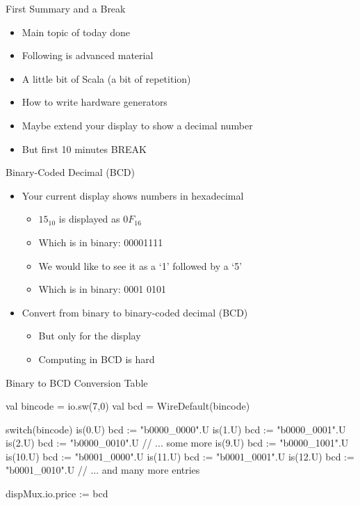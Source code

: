 \begin{frame}[fragile]{First Summary and a Break}
\begin{itemize}
\item Main topic of today done
\item Following is advanced material
\item A little bit of Scala (a bit of repetition)
\item How to write hardware generators
\item Maybe extend your display to show a decimal number
\item But first 10 minutes BREAK
\end{itemize}
\end{frame}


\begin{frame}[fragile]{Binary-Coded Decimal (BCD)}
\begin{itemize}
\item Your current display shows numbers in hexadecimal
\begin{itemize}
\item $15_{10}$ is displayed as $0F_{16}$
\item Which is in binary: 00001111
\item We would like to see it as a `1' followed by a `5'
\item Which is in binary: 0001 0101
\end{itemize}
\item Convert from binary to binary-coded decimal (BCD)
\begin{itemize}
\item But only for the display
\item Computing in BCD is hard
\end{itemize}
\end{itemize}
\end{frame}

\begin{frame}[fragile]{Binary to BCD Conversion Table}
\begin{chisel}
  val bincode = io.sw(7,0)
  val bcd = WireDefault(bincode)

  switch(bincode) {
    is(0.U) { bcd := "b0000_0000".U }
    is(1.U) { bcd := "b0000_0001".U }
    is(2.U) { bcd := "b0000_0010".U }
    // ... some more
    is(9.U) { bcd := "b0000_1001".U }
    is(10.U) { bcd := "b0001_0000".U }
    is(11.U) { bcd := "b0001_0001".U }
    is(12.U) { bcd := "b0001_0010".U }
    // ... and many more entries
  }

  dispMux.io.price := bcd
\end{chisel}
\end{frame}

